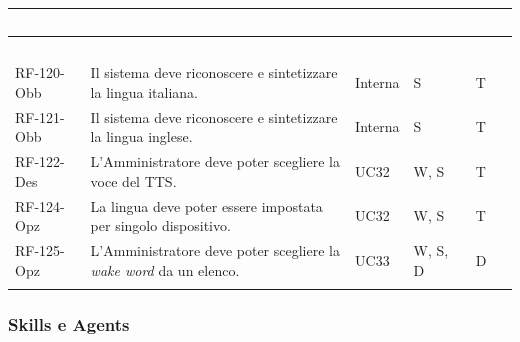 \documentclass[12pt,a4paper]{article}
\newcommand{\thc}[1]{\textcolor{white}{\textbf{#1}}}
\newcommand{\rl}{\\ \arrayrulecolor{bfline}\hline}
\begin{document}
\begin{longtable}{>{\raggedright\arraybackslash}p{}>{\raggedright\arraybackslash}p{}>{\raggedright\arraybackslash}p{}>{\raggedright\arraybackslash}p{}>{\centering\arraybackslash}p{}}
\rowcolor{bfblue}\thc{Codice} & \thc{Descrizione} & \thc{Fonti} & \thc{Comp.} & \thc{Ver.} \\
\endfirsthead
\rowcolor{bfblue}\thc{Codice} & \thc{Descrizione} & \thc{Fonti} & \thc{Comp.} & \thc{Ver.} \\
\endhead
RF-120-Obb & Il sistema deve riconoscere e sintetizzare la lingua italiana. & Interna & S & T \rl
RF-121-Obb & Il sistema deve riconoscere e sintetizzare la lingua inglese. & Interna & S & T \rl
RF-122-Des & L'Amministratore deve poter scegliere la voce del TTS. & UC32 & W, S & T \rl
RF-124-Opz & La lingua deve poter essere impostata per singolo dispositivo. & UC32 & W, S & T \rl
RF-125-Opz & L'Amministratore deve poter scegliere la \emph{wake word} da un elenco. & UC33 & W, S, D & D \rl
\end{longtable}

\subsubsection{Skills e Agents}
\end{document}
